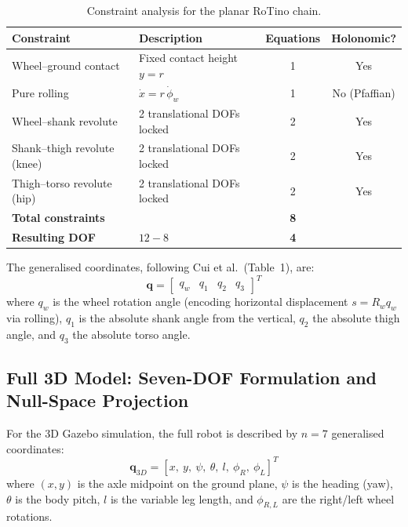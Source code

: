 \documentclass[11pt,a4paper]{article}
\newcommand{\bq}{\bm{q}}
\begin{document}
\begin{table}[H]
    \centering
    \caption{Constraint analysis for the planar RoTino chain.}
    \label{tab:dof}
    \begin{tabular}{llcc}
        \toprule
        Constraint & Description & Equations & Holonomic? \\
        \midrule
        Wheel--ground contact & Fixed contact height $y = r$ & 1 & Yes \\
        Pure rolling & $\dot{x} = r\,\dot{\phi}_w$ & 1 & No (Pfaffian) \\
        Wheel--shank revolute & 2 translational DOFs locked & 2 & Yes \\
        Shank--thigh revolute (knee) & 2 translational DOFs locked & 2 & Yes \\
        Thigh--torso revolute (hip) & 2 translational DOFs locked & 2 & Yes \\
        \midrule
        \textbf{Total constraints} & & \textbf{8} & \\
        \textbf{Resulting DOF} & $12 - 8$ & \textbf{4} & \\
        \bottomrule
    \end{tabular}
\end{table}

The generalised coordinates, following Cui et al.\ (Table~1), are:
\begin{equation}
    \bq = \begin{bmatrix} q_w & q_1 & q_2 & q_3 \end{bmatrix}^T
\end{equation}
where $q_w$ is the wheel rotation angle (encoding horizontal displacement $s = R_w q_w$
via rolling), $q_1$ is the absolute shank angle from the vertical, $q_2$ the absolute thigh
angle, and $q_3$ the absolute torso angle.

\subsection{Full 3D Model: Seven-DOF Formulation and Null-Space Projection}

For the 3D Gazebo simulation, the full robot is described by $n = 7$ generalised
coordinates:
\begin{equation}
    \bq_{3D} = [x,\ y,\ \psi,\ \theta,\ l,\ \phi_R,\ \phi_L]^T
\end{equation}
where $(x,y)$ is the axle midpoint on the ground plane, $\psi$ is the heading (yaw),
$\theta$ is the body pitch, $l$ is the variable leg length, and $\phi_{R,L}$ are the
right/left wheel rotations.
\end{document}
